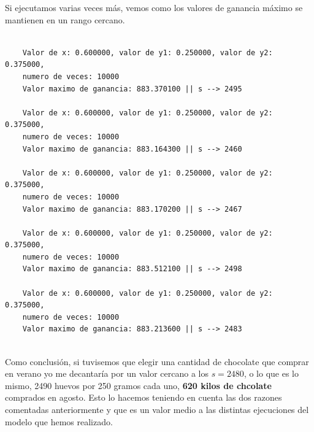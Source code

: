 \documentclass[11pt,a4paper]{article}
\begin{document}
Si ejecutamos varias veces más, vemos como los valores de ganancia máximo se mantienen en un rango cercano.
\begin{lstlisting}

	Valor de x: 0.600000, valor de y1: 0.250000, valor de y2: 0.375000,
	numero de veces: 10000
	Valor maximo de ganancia: 883.370100 || s --> 2495

	Valor de x: 0.600000, valor de y1: 0.250000, valor de y2: 0.375000,
	numero de veces: 10000
	Valor maximo de ganancia: 883.164300 || s --> 2460

	Valor de x: 0.600000, valor de y1: 0.250000, valor de y2: 0.375000,
	numero de veces: 10000
	Valor maximo de ganancia: 883.170200 || s --> 2467
	
	Valor de x: 0.600000, valor de y1: 0.250000, valor de y2: 0.375000,
	numero de veces: 10000
	Valor maximo de ganancia: 883.512100 || s --> 2498

	Valor de x: 0.600000, valor de y1: 0.250000, valor de y2: 0.375000,
	numero de veces: 10000
	Valor maximo de ganancia: 883.213600 || s --> 2483
		
\end{lstlisting}

Como conclusión, si tuvisemos que elegir una cantidad de chocolate que comprar en verano yo me decantaría por un valor cercano a los $s=2480$, o
lo que es lo mismo, 2490 huevos por 250 gramos cada uno, \textbf{620 kilos de chcolate} comprados en agosto. Esto lo hacemos teniendo en cuenta
las dos razones comentadas anteriormente y que es un valor medio a las distintas ejecuciones del modelo que hemos realizado.
\end{document}
